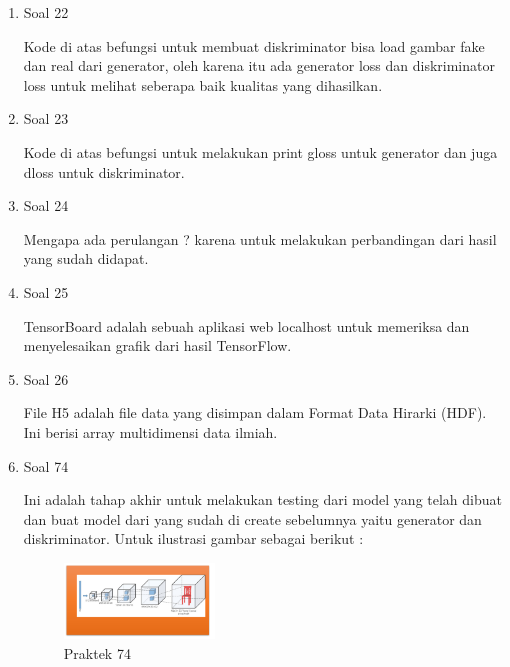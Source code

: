 \begin{enumerate}
    \item Soal 22
	\hfill\break
	
	Kode di atas befungsi untuk membuat diskriminator bisa load gambar fake dan real dari generator, oleh karena itu ada generator loss dan diskriminator loss untuk melihat seberapa baik kualitas yang dihasilkan.

    \item Soal 23
	\hfill\break
	
    Kode di atas befungsi untuk melakukan print gloss untuk generator dan juga dloss untuk diskriminator.
    
    \item Soal 24
	\hfill\break
	
    Mengapa ada perulangan ? karena untuk melakukan perbandingan dari hasil yang sudah didapat.
    
    \item Soal 25
	\hfill\break
	
    TensorBoard adalah sebuah aplikasi web localhost untuk memeriksa dan menyelesaikan grafik dari hasil TensorFlow.
    
    \item Soal 26
	\hfill\break
	
    File H5 adalah file data yang disimpan dalam Format Data Hirarki (HDF). Ini berisi array multidimensi data ilmiah.
    
    \item Soal 74
	\hfill\break
	
    Ini adalah tahap akhir untuk melakukan testing dari model yang telah dibuat dan buat model dari yang sudah di create sebelumnya yaitu generator dan diskriminator. Untuk ilustrasi gambar sebagai berikut : 
    \begin{figure}[H]
		\includegraphics[width=4cm]{figures/1174074/8/praktek74.png}
		\centering
		\caption{Praktek 74}
    \end{figure}
\end{enumerate}
